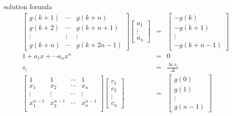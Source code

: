 \begin{frame}{solution formula}
\begin{eqnarray*}
\begin{bmatrix}
g(k+1) & \cdots & g(k+n) \\
g(k+2) & \cdots & g(k+n+1) \\
\vdots & \vdots & \vdots \\
g(k+n) & \cdots & g(k+2n-1)
\end{bmatrix}
\begin{bmatrix}
a_1 \\ \vdots \\ a_n
\end{bmatrix}
&=&
\begin{bmatrix}
-g(k) \\ -g(k+1) \\  \vdots \\  -g(k+n-1)
\end{bmatrix} \\
1+a_1 x + \cdots a_n x^n &=& 0  \\
s_i&=&\frac{\ln x_i}{\Delta}  \\
\begin{bmatrix}
1 & 1 & \cdots & 1 \\
x_1 & x_2 & \cdots & x_n \\
\vdots & \vdots & \cdots & \vdots \\
x_1^{n-1} & x_2^{n-1} & \cdots & x_n^{n-1} \\
\end{bmatrix}
\begin{bmatrix}
c_1 \\ c_2 \\  \vdots \\ c_n
\end{bmatrix}
&=&
\begin{bmatrix}
g(0) \\ g(1) \\  \vdots \\  g(n-1)
\end{bmatrix}
\end{eqnarray*}

\end{frame}



